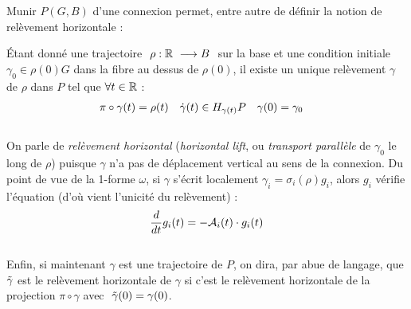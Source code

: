 Munir $P(G,B)$ d'une connexion permet, entre autre de définir la notion de relèvement horizontale :
\begin{definition}
	Étant donné une trajectoire $\ \rho : \R\ \lr B\ $ sur la base et une condition initiale $\gamma_0\in \rho(0)G$ dans la fibre au dessus de $\rho(0)$, il existe un unique relèvement $\gamma$ de $\rho$ dans $P$ tel que $\forall t\in\R$ :
	\begin{align} \label{eq:condi2hori_lift}
	\pi\circ\gamma(t) &= \rho(t)  &  \dot{\gamma}(t) &\in \hg[\gamma(t)]{P} &  \gamma(0) &= \gamma_0
	\end{align}
	\\
	On parle de \emph{relèvement horizontal} (\emph{horizontal lift}, ou \emph{transport parallèle} de $\gamma_0$ le long de $\rho$) puisque $\gamma$ n'a pas de déplacement vertical au sens de la connexion. Du point de vue de la 1-forme $\omega$, si $\gamma$ s'écrit localement $\gamma_i = \sigma_i(\rho) g_i$, alors $g_i$ vérifie l'équation (d'où vient l'unicité du relèvement) :
	\begin{equation} \label{eq:EDP2hori_lift}
		\frac{d}{dt}g_i(t)  = - \locconn_i(t) \cdot g_i(t)
	\end{equation}
	\\
	Enfin, si maintenant $\gamma$ est une trajectoire de $P$, on dira, par abue de langage, que $\Tilde{\gamma}$ est le relèvement horizontale de $\gamma$ si c'est le relèvement horizontale de la projection $\pi\circ\gamma$ avec $\ \Tilde{\gamma}(0) = \gamma(0)$.
\end{definition}
\skipl

